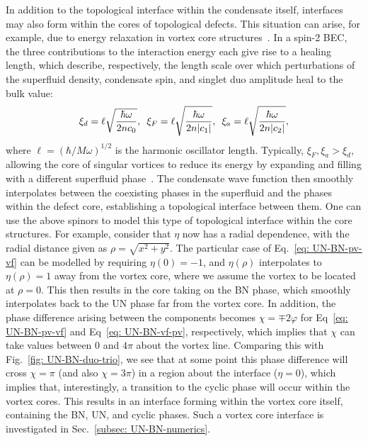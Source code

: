 In addition to the topological interface within the condensate itself,
interfaces may also form within the cores of topological defects.
This situation can arise, for example, due to energy relaxation in vortex core
structures~\cite{Ruostekoski2003,Lovegrove2012,Lovegrove2016,Borgh2016,
    Borgh2016a, Weiss2019,Xiao2021,Xiao2022}.
In a spin-2 BEC, the three contributions to the interaction energy each give
rise to a healing length, which describe, respectively, the length scale over
which perturbations of the superfluid density, condensate spin, and singlet duo
amplitude heal to the bulk value:
\begin{equation}
    \xi_d=\ell \sqrt{\frac{\hbar\omega}{2nc_0}},
    \enskip \xi_F=\ell \sqrt{\frac{\hbar\omega}{2n|c_1|}},
    \enskip \xi_a=\ell \sqrt{\frac{\hbar\omega}{2n|c_2|}},
    \label{eq: spin-2-healing-lengths}
\end{equation}
where \(\ell = {(\hbar/M\omega)}^{1/2}\) is the harmonic oscillator length.
Typically, \(\xi_F,\xi_a > \xi_d\), allowing the core of singular vortices
to reduce its energy by expanding and filling with a different superfluid
phase~\cite{Ruostekoski2003}.
The condensate wave function then smoothly interpolates between the coexisting
phases in the superfluid and the phases within the defect core, establishing a
topological interface between them.
One can use the above spinors to model this type of topological interface within
the core structures.
For example, consider that \(\eta \) now has a radial dependence, with the
radial distance given as \(\rho = \sqrt{x^2 + y^2}\).
The particular case of Eq.~\eqref{eq: UN-BN-pv-vf} can be modelled by requiring
\(\eta(0) = -1\), and \(\eta(\rho)\) interpolates to \(\eta(\rho) = 1\) away
from the vortex core, where we assume the vortex to be located at \(\rho = 0\).
This then results in the core taking on the BN phase, which smoothly
interpolates back to the UN phase far from the vortex core.
In addition, the phase difference arising between the components becomes
\(\chi = \mp 2\varphi \) for Eq~\eqref{eq: UN-BN-pv-vf} and
Eq~\eqref{eq: UN-BN-vf-pv}, respectively, which implies that \(\chi \) can take
values between 0 and \(4\pi \) about the vortex line.
Comparing this with Fig.~\ref{fig: UN-BN-duo-trio}, we see that at some point
this phase difference will cross \(\chi = \pi \) (and also \(\chi=3\pi \)) in a
region about the interface (\(\eta = 0\)), which implies that, interestingly, a
transition to the cyclic phase will occur within the vortex cores.
This results in an interface forming within the vortex core itself, containing
the BN, UN, and cyclic phases.
Such a vortex core interface is investigated in
Sec.~\ref{subsec: UN-BN-numerics}.

